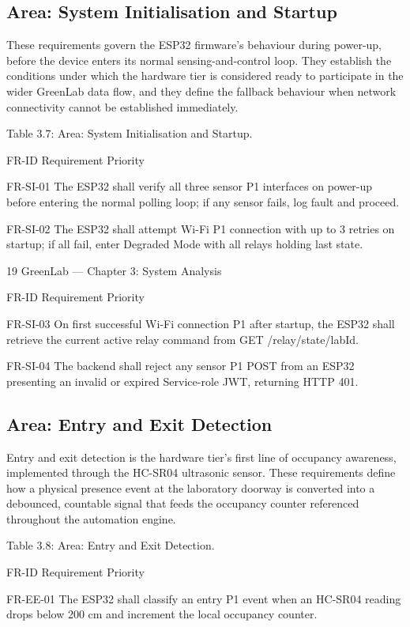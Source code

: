 \subsection{Area: System Initialisation and Startup}

These requirements govern the ESP32 firmware's behaviour during power-up, before the device
enters its normal sensing-and-control loop. They establish the conditions under which the hardware
tier is considered ready to participate in the wider GreenLab data flow, and they define the fallback
behaviour when network connectivity cannot be established immediately.

Table 3.7: Area: System Initialisation and Startup.

FR-ID Requirement Priority

FR-SI-01 The ESP32 shall verify all three sensor P1
interfaces on power-up before entering
the normal polling loop; if any sensor
fails, log fault and proceed.

FR-SI-02 The ESP32 shall attempt Wi-Fi P1
connection with up to 3 retries on
startup; if all fail, enter Degraded
Mode with all relays holding last state.




19
GreenLab --- Chapter 3: System Analysis


FR-ID Requirement Priority

FR-SI-03 On first successful Wi-Fi connection P1
after startup, the ESP32 shall retrieve
the current active relay command from
GET /relay/state/{labId}.

FR-SI-04 The backend shall reject any sensor P1
POST from an ESP32 presenting an
invalid or expired Service-role JWT,
returning HTTP 401.


\subsection{Area: Entry and Exit Detection}

Entry and exit detection is the hardware tier's first line of occupancy awareness, implemented
through the HC-SR04 ultrasonic sensor. These requirements define how a physical presence event
at the laboratory doorway is converted into a debounced, countable signal that feeds the occupancy
counter referenced throughout the automation engine.

Table 3.8: Area: Entry and Exit Detection.

FR-ID Requirement Priority

FR-EE-01 The ESP32 shall classify an entry P1
event when an HC-SR04 reading drops
below 200 cm and increment the local
occupancy counter.

